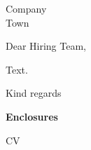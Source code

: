 \documentclass[paper=a4,fontsize=11pt,parskip=half-,fromalign=left,fromphone=true,fromemail=true,
  backaddress=underlined,foldmarks=false,enlargefirstpage=true,firstfoot=false]{scrlttr2}
\begin{document}
\begin{letter}{Company\\Town}
\opening{Dear Hiring Team,}
Text.
\closing{Kind regards}
\par\bigskip\textbf{Enclosures}\par
CV\par
\end{letter}
\end{document}
